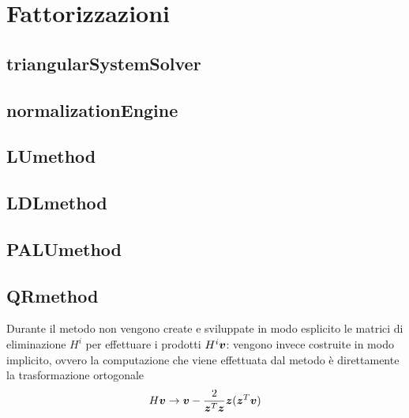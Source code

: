 \section{Fattorizzazioni}
\subsection{triangularSystemSolver}


\subsection{normalizationEngine}


\subsection{LUmethod}
\label{subsection:LUmethod}


\subsection{LDLmethod}
\label{subsection:LDLmethod}


\subsection{PALUmethod}
\label{subsection:PALUmethod}


\subsection{QRmethod}
\label{subsection:QRmethod}
\begin{oss}
Durante il metodo non vengono create e sviluppate in modo esplicito le matrici
di eliminazione $H^{i}$ per effettuare i prodotti $H^{i}\boldsymbol{v}$: vengono
invece costruite in modo implicito, ovvero la computazione che viene effettuata
dal metodo \`e direttamente la trasformazione ortogonale 
\begin{displaymath}
H\boldsymbol{v} \rightarrow \boldsymbol{v} -
\frac{2}{\boldsymbol{z}^{T}\boldsymbol{z}}\boldsymbol{z}(\boldsymbol{z}^{T}\boldsymbol{v})
\end{displaymath}
\end{oss}

